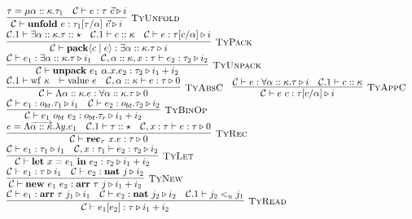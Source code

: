 \documentclass[fleqn]{article}
\begin{document}
\[\begin{array}{l}
    \infer[\textsc{TyUnfold}]{\mathcal{C} \vdash \mathbf{unfold}~e : \tau_1[\tau/\alpha]~\vec{c} \triangleright i}{\tau = \mu \alpha :: \kappa. \tau_1 & \mathcal{C} \vdash e : \tau~\vec{c} \triangleright i} \\
    \infer[\textsc{TyPack}]{\mathcal{C} \vdash \mathbf{pack}\langle c \mid e \rangle : \exists \alpha :: \kappa. \tau \triangleright i}{\mathcal{C}.1 \vdash \exists \alpha :: \kappa. \tau :: \star & \mathcal{C}.1 \vdash c :: \kappa & \mathcal{C} \vdash e : \tau[c/\alpha] \triangleright i} \\
    \infer[\textsc{TyUnpack}]{\mathcal{C} \vdash \mathbf{unpack}~e_1~\alpha.x.e_2 : \tau_2 \triangleright i_1 + i_2}{\mathcal{C} \vdash e_1 : \exists \alpha :: \kappa. \tau \triangleright i_1 & \mathcal{C},\alpha::\kappa,x:\tau \vdash e_2 : \tau_2 \triangleright i_2} \\
    \infer[\textsc{TyAbsC}]{\mathcal{C} \vdash \Lambda \alpha :: \kappa. e : \forall \alpha :: \kappa. \tau \triangleright 0}{\mathcal{C}.1 \vdash \mathrm{wf}~\kappa & \vdash \mathrm{value}~e & \mathcal{C},\alpha :: \kappa \vdash e : \tau \triangleright 0} \hspace{1em}
    \infer[\textsc{TyAppC}]{\mathcal{C} \vdash e~c : \tau[c/\alpha] \triangleright i}{\mathcal{C} \vdash e : \forall \alpha :: \kappa. \tau \triangleright i & \mathcal{C}.1 \vdash c :: \kappa} \\
    \infer[\textsc{TyBinOp}]{\mathcal{C} \vdash e_1~o_{bt}~e_2 : o_{bt}.\tau_r \triangleright i_1 + i_2}{\mathcal{C} \vdash e_1 : o_{bt}.\tau_1 \triangleright i_1 & \mathcal{C} \vdash e_2 : o_{bt}.\tau_2 \triangleright i_2} \\
    \infer[\textsc{TyRec}]{\mathcal{C} \vdash \mathbf{rec}_\tau~x. e : \tau \triangleright 0}{e = \Lambda \overrightarrow{\alpha :: \kappa}. \lambda y. e_1 & \mathcal{C}.1 \vdash \tau :: \star & \mathcal{C},x:\tau \vdash e : \tau \triangleright 0} \\
    \infer[\textsc{TyLet}]{\mathcal{C} \vdash \mathbf{let}~x=e_1~\mathbf{in}~e_2 : \tau_2 \triangleright i_1 + i_2}{\mathcal{C} \vdash e_1 : \tau_1 \triangleright i_1 & \mathcal{C},x:\tau_1 \vdash e_2 : \tau_2 \triangleright i_2} \\
    \infer[\textsc{TyNew}]{\mathcal{C} \vdash \mathbf{new}~e_1~e_2 : \mathbf{arr}~\tau~j \triangleright i_1 + i_2}{\mathcal{C} \vdash e_1 : \tau \triangleright i_1 & \mathcal{C} \vdash e_2 : \mathbf{nat}~j \triangleright i_2} \\
    \infer[\textsc{TyRead}]{\mathcal{C} \vdash e_1[e_2] : \tau \triangleright i_1 + i_2}{\mathcal{C} \vdash e_1 : \mathbf{arr}~\tau~j_1 \triangleright i_1 & \mathcal{C} \vdash e_2 : \mathbf{nat}~j_2 \triangleright i_2 & \mathcal{C}.1 \vdash j_2 <_n j_1} \\

\end{array}\]
\end{document}
